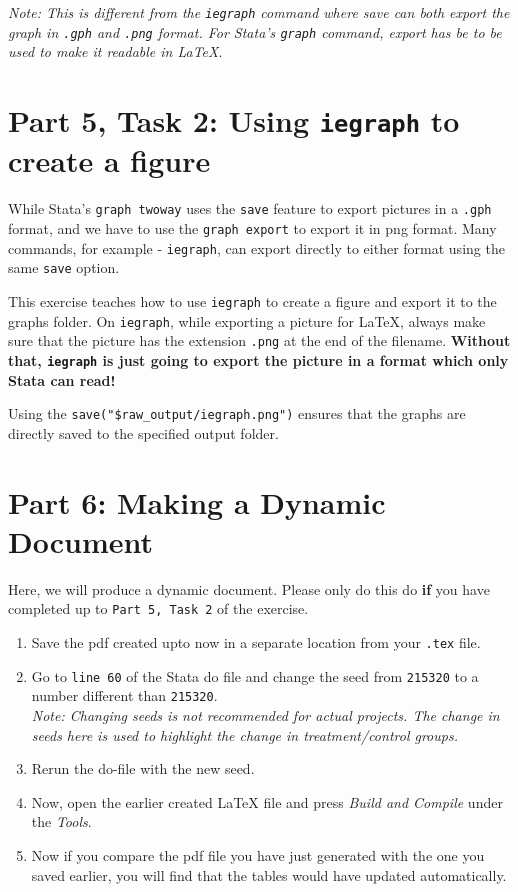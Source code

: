 \documentclass[]{article}
\begin{document}
\textit{Note: This is different from the \texttt{iegraph} command where save can both export the graph in \texttt{.gph} and \texttt{.png} format. For Stata's \texttt{graph} command, export has be to be used to make it readable in {\LaTeX}}. 

\section*{Part 5, Task 2: Using \texttt{iegraph} to create a figure}

While Stata's \texttt{graph twoway} uses the \texttt{save} feature to export pictures in a \texttt{.gph} format, and we have to use the \texttt{graph export} to export it in png format. Many commands, for example - \texttt{iegraph}, can export directly to either format using the same \texttt{save} option. 

This exercise teaches how to use \texttt{iegraph} to create a figure and export it to the graphs folder. On \texttt{iegraph}, while exporting a picture for {\LaTeX}, always make sure that the picture has the extension \texttt{.png} at the end of the filename. \textbf{Without that, \texttt{iegraph} is just going to export the picture in a format which only Stata can read!}

Using the \verb|save("$raw_output/iegraph.png")| ensures that the graphs are directly saved to the specified output folder. 



\section*{Part 6: Making a Dynamic Document }

Here, we will produce a dynamic document. Please only do this do \textbf{if} you have completed up to \texttt{Part 5, Task 2} of the exercise. 

\begin{enumerate}
	\item Save the pdf created upto now in a separate location from your \texttt{.tex} file.
	\item Go to \texttt{line 60} of the Stata do file and change the seed from \texttt{215320} to a number different than \texttt{215320}.\\ \textit{Note: Changing seeds is not recommended for actual projects. The change in seeds here is used to highlight the change in treatment/control groups.}
	\item Rerun the do-file with the new seed.
	\item Now, open the earlier created {\LaTeX} file and press \textit{Build and Compile} under the \textit{Tools}.
	\item Now if you compare the pdf file you have just generated with the one you saved earlier, you will find that the tables would have updated automatically. 
\end{enumerate}
\end{document}
